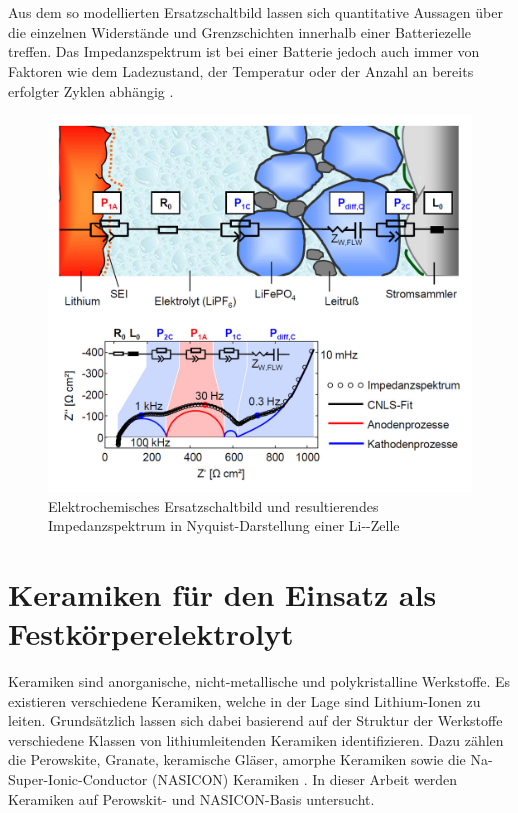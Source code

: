 \documentclass[a4paper, 11pt, headsepline,footsepline,twoside,abstract]{scrbook}
\begin{document}
\\\\
Aus dem so modellierten Ersatzschaltbild lassen sich quantitative Aussagen über die einzelnen Widerstände und Grenzschichten innerhalb einer Batteriezelle treffen. Das Impedanzspektrum ist bei einer Batterie jedoch auch immer von Faktoren wie dem Ladezustand, der Temperatur oder der Anzahl an bereits erfolgter Zyklen abhängig \cite{Linden2011}.
\begin{figure}
	\centering
	\includegraphics[width=0.8\columnwidth]{images/Schema_IS.jpg}
	\caption{Elektrochemisches Ersatzschaltbild und resultierendes Impedanzspektrum in Nyquist-Darstellung einer Li--Zelle \cite{bub_skript}}
	\label{schema_is}
\end{figure}
\section{Keramiken für den Einsatz als Festkörperelektrolyt}
Keramiken sind anorganische, nicht-metallische und polykristalline Werkstoffe. Es existieren verschiedene Keramiken, welche in der Lage sind Lithium-Ionen zu leiten. Grundsätzlich lassen sich dabei basierend auf der Struktur der Werkstoffe verschiedene Klassen von lithiumleitenden Keramiken identifizieren. Dazu zählen die Perowskite, Granate, keramische Gläser, amorphe Keramiken sowie die Na-Super-Ionic-Conductor (NASICON) Keramiken \cite{tatsumisago2013recent}. In dieser Arbeit werden Keramiken auf Perowskit- und NASICON-Basis untersucht.
\end{document}
